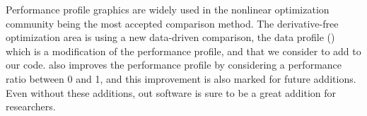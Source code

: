Performance profile graphics are widely used in the nonlinear optimization
community being the most accepted comparison method.
The derivative-free optimization area is using a new data-driven comparison,
the data profile (\cite{bib:more2009benchmarking}) which is a modification of the
performance profile, and that we consider to add to our code.
\textcite{bib:mahajan2012solving} also improves the performance profile by considering
a performance ratio between 0 and 1, and this improvement is also marked for
future additions.
Even without these additions, out software is sure to be a great addition for
researchers.
